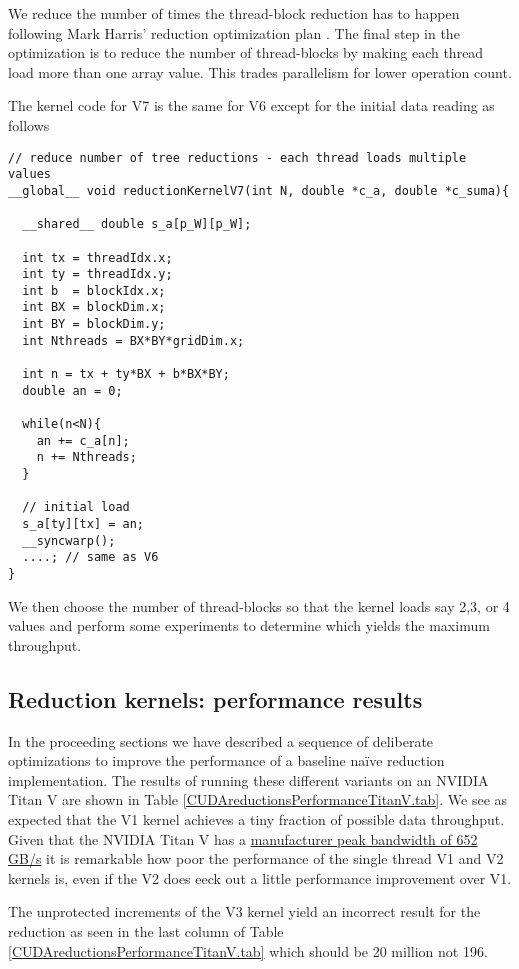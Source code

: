 We reduce the number of times the thread-block reduction has to happen following Mark Harris' reduction optimization plan \cite{markidis2018nvidia}. The final step in the optimization is to reduce the number of thread-blocks by making each thread load more than one array value. This trades parallelism for lower operation count. 

The kernel code for V7 is the same for V6 except for the initial data reading as follows

\begin{verbatim}
// reduce number of tree reductions - each thread loads multiple values                                                         
__global__ void reductionKernelV7(int N, double *c_a, double *c_suma){

  __shared__ double s_a[p_W][p_W];

  int tx = threadIdx.x;
  int ty = threadIdx.y;
  int b  = blockIdx.x;
  int BX = blockDim.x;
  int BY = blockDim.y;
  int Nthreads = BX*BY*gridDim.x;

  int n = tx + ty*BX + b*BX*BY;
  double an = 0;

  while(n<N){
    an += c_a[n];
    n += Nthreads;
  }

  // initial load   
  s_a[ty][tx] = an;
  __syncwarp();
  ....; // same as V6
}
\end{verbatim}
We then choose the number of thread-blocks so that the kernel loads say 2,3, or 4 values and perform some experiments to determine which yields the maximum throughput.

\subsection{Reduction kernels: performance results}
\label{CUDAreductionPerformance.sec}

In the proceeding sections we have described a sequence of deliberate optimizations to improve the performance of a baseline na\"{i}ve reduction implementation. The results of running these different variants on an NVIDIA Titan V are shown in Table \ref{CUDAreductionsPerformanceTitanV.tab}. We see as expected that the V1 kernel achieves a tiny fraction of possible data throughput. Given that the NVIDIA Titan V has a \href{https://www.nvidia.com/en-us/titan/titan-v/}{manufacturer peak bandwidth of 652 GB/s} it is remarkable how poor the performance of the single thread V1 and V2 kernels is, even if the V2 does eeck out a little performance improvement over V1.

The unprotected increments of the V3 kernel yield an incorrect result for the reduction as seen in the last column of Table \ref{CUDAreductionsPerformanceTitanV.tab} which should be 20 million not 196. 

